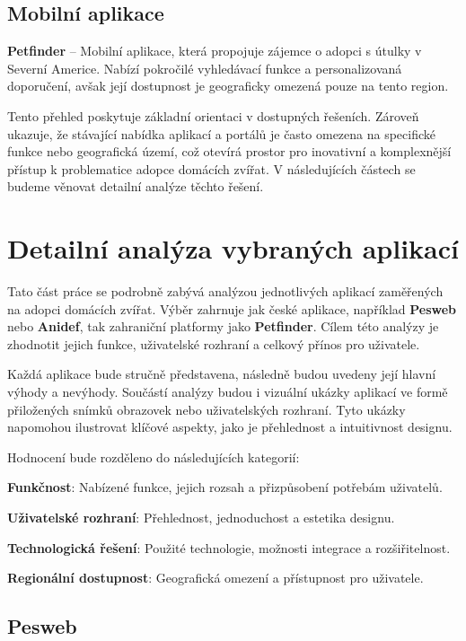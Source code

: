 \documentclass[czech, bp, kiv, he, iso690numb, pdf]{fasthesis}
\begin{document}
    \subsection{Mobilní aplikace}
    \textbf{Petfinder} – Mobilní aplikace, která propojuje zájemce o adopci s útulky v Severní Americe. Nabízí pokročilé vyhledávací funkce a personalizovaná doporučení, avšak její dostupnost je geograficky omezená pouze na tento region.

    Tento přehled poskytuje základní orientaci v dostupných řešeních. Zároveň ukazuje, že stávající nabídka aplikací a portálů je často omezena na specifické funkce nebo geografická území, což otevírá prostor pro inovativní a komplexnější přístup k problematice adopce domácích zvířat. V následujících částech se budeme věnovat detailní analýze těchto řešení.

    \section{Detailní analýza vybraných aplikací}

    Tato část práce se podrobně zabývá analýzou jednotlivých aplikací zaměřených na adopci domácích zvířat. Výběr zahrnuje jak české aplikace, například \textbf{Pesweb} nebo \textbf{Anidef}, tak zahraniční platformy jako \textbf{Petfinder}. Cílem této analýzy je zhodnotit jejich funkce, uživatelské rozhraní a celkový přínos pro uživatele.

    Každá aplikace bude stručně představena, následně budou uvedeny její hlavní výhody a nevýhody. Součástí analýzy budou i vizuální ukázky aplikací ve formě přiložených snímků obrazovek nebo uživatelských rozhraní. Tyto ukázky napomohou ilustrovat klíčové aspekty, jako je přehlednost a intuitivnost designu.

    \noindent Hodnocení bude rozděleno do následujících kategorií:

    \noindent\textbf{Funkčnost}: Nabízené funkce, jejich rozsah a přizpůsobení potřebám uživatelů.

    \noindent\textbf{Uživatelské rozhraní}: Přehlednost, jednoduchost a estetika designu.

    \noindent\textbf{Technologická řešení}: Použité technologie, možnosti integrace a rozšiřitelnost.

    \noindent\textbf{Regionální dostupnost}: Geografická omezení a přístupnost pro uživatele.

    \pagebreak
    \subsection{Pesweb}
\end{document}

